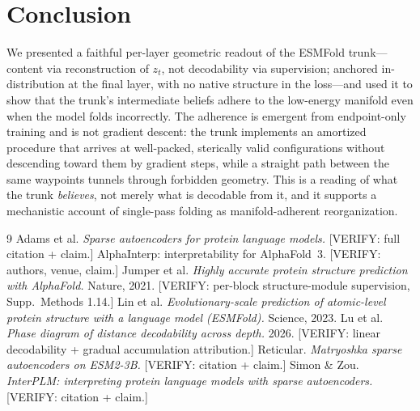 \documentclass[11pt]{article}
\newcommand{\VERIFY}[1]{{\color{red}\small\textsf{[VERIFY: #1]}}}
\begin{document}
\section{Conclusion}
\label{sec:conclusion}

We presented a faithful per-layer geometric readout of the ESMFold trunk---content
via reconstruction of $z_t$, not decodability via supervision; anchored
in-distribution at the final layer, with no native structure in the loss---and
used it to show that the trunk's intermediate beliefs adhere to the low-energy
manifold even when the model folds incorrectly. The adherence is emergent from
endpoint-only training and is not gradient descent: the trunk implements an
amortized procedure that arrives at well-packed, sterically valid configurations
without descending toward them by gradient steps, while a straight path between
the same waypoints tunnels through forbidden geometry. This is a reading of what
the trunk \emph{believes}, not merely what is decodable from it, and it supports a
mechanistic account of single-pass folding as manifold-adherent reorganization.

\begin{thebibliography}{9}
\small
{} Adams et al. \emph{Sparse autoencoders for
protein language models.} \VERIFY{full citation + claim.}
 AlphaInterp: interpretability for AlphaFold~3.
\VERIFY{authors, venue, claim.}
 Jumper et al. \emph{Highly accurate
protein structure prediction with AlphaFold.} Nature, 2021. \VERIFY{per-block
structure-module supervision, Supp.\ Methods 1.14.}
 Lin et al. \emph{Evolutionary-scale prediction
of atomic-level protein structure with a language model (ESMFold).} Science, 2023.
 Lu et al. \emph{Phase diagram of distance
decodability across depth.} 2026. \VERIFY{linear decodability + gradual
accumulation attribution.}
 Reticular. \emph{Matryoshka sparse
autoencoders on ESM2-3B.} \VERIFY{citation + claim.}
 Simon \& Zou. \emph{InterPLM:
interpreting protein language models with sparse autoencoders.} \VERIFY{citation
+ claim.}
\end{thebibliography}
\end{document}
